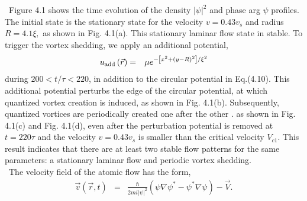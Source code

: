 \documentclass[12pt,a4paper]{report} %
\begin{document}
\ Figure 4.1 shows the time evolution of the density $|\psi|^2$
and phase arg $\psi$ profiles. The initial state is the stationary
state for the velocity $v=0.43 v_s$ and radius $R=4.1 \xi,$
as shown in Fig. 4.1(a). This stationary laminar flow state
in stable. To trigger the vortex shedding, we apply an
additional potential,
\begin{eqnarray}
u_{{\rm add}} \left( \vec{r} \right) & = & 
\mu e^{- \left[ x^2 + \left( y - R\right)^2 \right] / \xi^2}
\end{eqnarray}
during $200 < t/\tau < 220$, in addition to the circular 
potential in Eq.(4.10). This additional potential perturbs the
edge of the circular potential, at which quantized vortex
creation is induced, as shown in Fig. 4.1(b). Subsequently,
quantized vortices are periodically created one after the other \cite{52}.
as shown in Fig. 4.1(c) and Fig. 4.1(d), even after the 
perturbation potential is removed at $t=220 \tau$ and the
velocity $v= 0.43 v_s$ is smaller than the critical velocity
$V_{c1}$. This result indicates that there are at least
two stable flow patterns for the same parameters: a stationary
laminar flow and periodic vortex shedding.
\\
\ The velocity field of the atomic flow has the form,
\begin{eqnarray}
\vec{v} \left( \vec{r}, t \right) & = &
\frac{\hbar}{2 m i | \psi |^2} \left( \psi \nabla \psi^* - \psi^* \nabla \psi \right) - \vec{V}.
\end{eqnarray}
\end{document}
